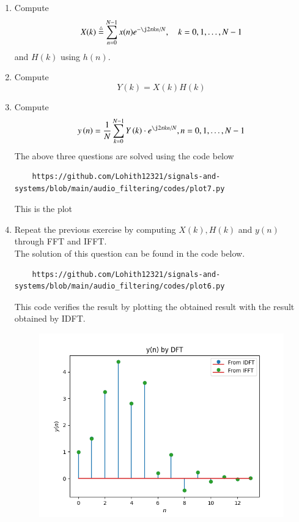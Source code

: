 \documentclass[journal,12pt,twocolumn]{IEEEtran}
\newcommand{\define}{\stackrel{\triangle}{=}}
\theoremstyle{remark}
\begin{document}
\begin{enumerate}[label=\thesection.\arabic*
,ref=\thesection.\theenumi]
\begin{enumerate}[label=\thesection.\arabic*
,ref=\thesection.\theenumi]
\begin{enumerate}[label=\thesection.\arabic*
,ref=\thesection.\theenumi]
\section{DFT and FFT}
\item
Compute
\begin{equation}
X(k) \define \sum _{n=0}^{N-1}x(n) e^{-\j2\pi kn/N}, \quad k = 0,1,\dots, N-1
\end{equation}
and $H(k)$ using $h(n)$.
\item Compute 
\begin{equation}
Y(k) = X(k)H(k)
\label{eq:fp}
\end{equation}
\item Compute
\begin{equation}
y\brak{n}={\frac {1}{N}}\sum _{k=0}^{N-1}Y\brak{k}\cdot e^{\j 2\pi kn/N},
\label{eq:inv-ft}
n = 0,1,\dots, N-1
\end{equation}
\solution The above three questions are solved using the code below\\
\begin{lstlisting}
    https://github.com/Lohith12321/signals-and-systems/blob/main/audio_filtering/codes/plot7.py    
\end{lstlisting}
This is the plot 
\item Repeat the previous exercise by computing $X(k), H(k)$ and $y(n)$ through FFT and IFFT.\\
\solution The solution of this question can be found in the code below.\\
\begin{lstlisting}
    https://github.com/Lohith12321/signals-and-systems/blob/main/audio_filtering/codes/plot6.py    
\end{lstlisting}
This code verifies the result by plotting the obtained result with the result obtained by IDFT.
\begin{figure}[ht]
    \centering  
\includegraphics[width=\columnwidth]{figs/plot6.png}

\end{figure}
\end{enumerate}
\end{enumerate}
\end{enumerate}
\end{document}
